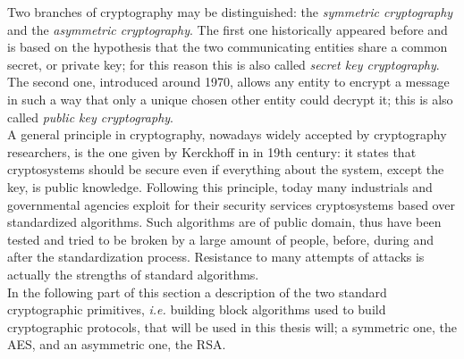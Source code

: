 Two branches of cryptography may be distinguished: the \emph{symmetric cryptography} and the \emph{asymmetric cryptography}. The first one historically appeared before and is based on the hypothesis that the two communicating entities share a common secret, or private key; for this reason this is also called \emph{secret key cryptography}. The second one, introduced around 1970, allows any entity to encrypt a message in such a way that only a unique chosen other entity could decrypt it; this is also called \emph{public key cryptography}. \\

A general principle in cryptography, nowadays widely accepted by cryptography researchers, is the one given by Kerckhoff in in 19th century: it states that cryptosystems should be secure even if everything about the system, except the key, is public knowledge. Following this principle, today many industrials and governmental agencies exploit for their security services cryptosystems based over standardized algorithms. Such algorithms are of public domain, thus have been tested and tried to be broken by a large amount of people, before, during and after the standardization process. Resistance to many attempts of attacks is actually the strengths of standard algorithms.\\

In the following part of this section a description of the two standard cryptographic primitives, \emph{i.e.} building block algorithms used to build cryptographic protocols, that will be used in this thesis will; a symmetric one, the AES, and an asymmetric one, the RSA. 
